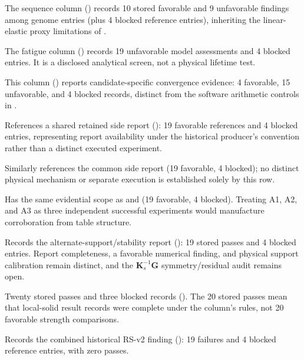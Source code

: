 The sequence column () records 10 stored favorable and 9 unfavorable findings among genome entries (plus 4 blocked reference entries), inheriting the linear-elastic proxy limitations of .

The fatigue column () records 19 unfavorable model assessments and 4 blocked entries. It is a disclosed analytical screen, not a physical lifetime test.

This column () reports candidate-specific convergence evidence: 4 favorable, 15 unfavorable, and 4 blocked records, distinct from the software arithmetic controls in .

References a shared retained side report (): 19 favorable references and 4 blocked entries, representing report availability under the historical producer's convention rather than a distinct executed experiment.

Similarly references the common side report (19 favorable, 4 blocked); no distinct physical mechanism or separate execution is established solely by this row.

Has the same evidential scope as  and  (19 favorable, 4 blocked). Treating A1, A2, and A3 as three independent successful experiments would manufacture corroboration from table structure.

Records the alternate-support/stability report (): 19 stored passes and 4 blocked entries. Report completeness, a favorable numerical finding, and physical support calibration remain distinct, and the  $\mathbf{K}_s^{-1}\mathbf{G}$ symmetry/residual audit remains open.

Twenty stored passes and three blocked records (). The 20 stored passes mean that local-solid result records were complete under the column's rules, not 20 favorable strength comparisons.

Records the combined historical RS-v2 finding (): 19 failures and 4 blocked reference entries, with zero passes.
